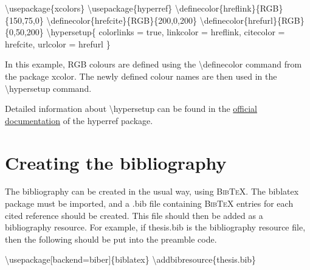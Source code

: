 \documentclass[twoside,openany]{thesis}
\begin{document}
{\ttfamily
    \textbackslash usepackage\{xcolors\}\linebreak
    \textbackslash usepackage\{hyperref\}\linebreak
    \linebreak
    \textbackslash definecolor\{hreflink\}\{RGB\}\{150,75,0\}\linebreak
    \textbackslash definecolor\{hrefcite\}\{RGB\}\{200,0,200\}\linebreak
    \textbackslash definecolor\{hrefurl\}\{RGB\}\{0,50,200\}\linebreak
    \linebreak
    \textbackslash hypersetup\{\linebreak
        \null\quad colorlinks = true,\linebreak
        \null\quad linkcolor = hreflink,\linebreak
        \null\quad citecolor = hrefcite,\linebreak
        \null\quad urlcolor = hrefurl\linebreak
    \}
}

In this example, RGB colours are defined using the {\ttfamily\textbackslash definecolor} command from the package {\ttfamily xcolor}.
The newly defined colour names are then used in the {\ttfamily\textbackslash hypersetup} command.

Detailed information about {\ttfamily\textbackslash hypersetup} can be found in the \href{https://ftp.agdsn.de/pub/mirrors/latex/dante/macros/latex/contrib/hyperref/doc/manual.pdf}{official documentation} of the {\ttfamily hyperref} package.

\chapter{Creating the bibliography}\label{ap:Creating the bibliography}

The bibliography can be created in the usual way, using {\scshape Bib\TeX}.
The {\ttfamily biblatex} package must be imported, and a {\ttfamily*.bib} file containing {\scshape Bib\TeX} entries for each cited reference should be created.
This file should then be added as a bibliography resource.
For example, if {\ttfamily thesis.bib} is the bibliography resource file, then the following should be put into the preamble code.

{\ttfamily
    \textbackslash usepackage[backend=biber]\{biblatex\}\linebreak
    \textbackslash addbibresource\{thesis.bib\}
}
\end{document}
